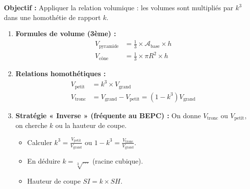 \documentclass[11pt]{article}
\begin{document}
\begin{methode}
    \textbf{Objectif :} Appliquer la relation volumique : les volumes sont multipliés par $k^3$ dans une homothétie de rapport $k$.
    \begin{enumerate}
        \item \textbf{Formules de volume (3ème) :}
            \begin{align*}
                V_{\text{pyramide}} &= \frac{1}{3} \times \mathcal{A}_{\text{base}} \times h \\
                V_{\text{cône}} &= \frac{1}{3} \times \pi R^2 \times h
            \end{align*}
        \item \textbf{Relations homothétiques :}
            \begin{align*}
                V_{\text{petit}} &= k^3 \times V_{\text{grand}} \\
                V_{\text{tronc}} &= V_{\text{grand}} - V_{\text{petit}} = (1 - k^3) V_{\text{grand}}
            \end{align*}
        \item \textbf{Stratégie « Inverse » (fréquente au BEPC) :} On donne $V_{\text{tronc}}$ ou $V_{\text{petit}}$, on cherche $k$ ou la hauteur de coupe.
            \begin{itemize}
                \item Calculer $k^3 = \frac{V_{\text{petit}}}{V_{\text{grand}}}$ ou $1 - k^3 = \frac{V_{\text{tronc}}}{V_{\text{grand}}}$.
                \item En déduire $k = \sqrt[3]{\dots}$ (racine cubique).
                \item Hauteur de coupe $SI = k \times SH$.
            \end{itemize}
    \end{enumerate}
\end{methode}
\end{document}
